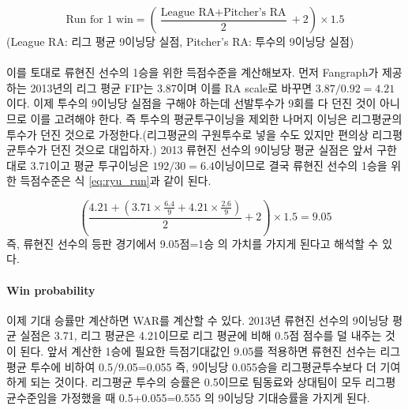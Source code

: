 \documentclass[11pt]{article}
\begin{document}
\begin{equation}
\label{eq:win_conversion}
\text{Run for 1 win} = (\frac{\text{League RA} + \text{Pitcher’s RA}}{2}+2) \times 1.5
\end{equation}
(League RA: 리그 평균 9이닝당 실점, Pitcher's RA: 투수의 9이닝당 실점)\\\\
이를 토대로 류현진 선수의 1승을 위한 득점수준을 계산해보자. 먼저 Fangraph가 제공하는 2013년의 리그 평균 FIP는 3.87이며 이를 RA scale로 바꾸면 $3.87/0.92=4.21$ 이다. 이제 투수의 9이닝당 실점을 구해야 하는데 선발투수가 9회를 다 던진 것이 아니므로 이를 고려해야 한다. 즉 투수의 평균투구이닝을 제외한 나머지 이닝은 리그평균의 투수가 던진 것으로 가정한다.(리그평균의 구원투수로 넣을 수도 있지만 편의상 리그평균투수가 던진 것으로 대입하자.) 2013 류현진 선수의 9이닝당 평균 실점은 앞서 구한대로 3.71이고 평균 투구이닝은 $192/30=6.4$이닝이므로 결국 류현진 선수의 1승을 위한 득점수준은 식 \ref{eq:ryu_run}과 같이 된다. 

\begin{equation}
\label{eq:ryu_run}
(\frac{4.21 + (3.71 \times \frac{6.4}{9} + 4.21 \times \frac{2.6}{9})} {2} +2) \times 1.5 = 9.05
\end{equation}
즉, 류현진 선수의 등판 경기에서 9.05점=1승 의 가치를 가지게 된다고 해석할 수 있다. 

\paragraph{Win probability}
이제 기대 승률만 계산하면 WAR를 계산할 수 있다\cite{winconversion}. 2013년 류현진 선수의 9이닝당 평균 실점은 3.71, 리그 평균은 4.21이므로 리그 평균에 비해 0.5점 점수를 덜 내주는 것이 된다. 앞서 계산한 1승에 필요한 득점기대값인 9.05를 적용하면 류현진 선수는 리그 평균 투수에 비하여 0.5/9.05=0.055 즉, 9이닝당 0.055승을 리그평균투수보다 더 기여하게 되는 것이다. 리그평균 투수의 승률은 0.5이므로 팀동료와 상대팀이 모두 리그평균수준임을 가정했을 때 0.5+0.055=0.555 의 9이닝당 기대승률을 가지게 된다. 
\end{document}
